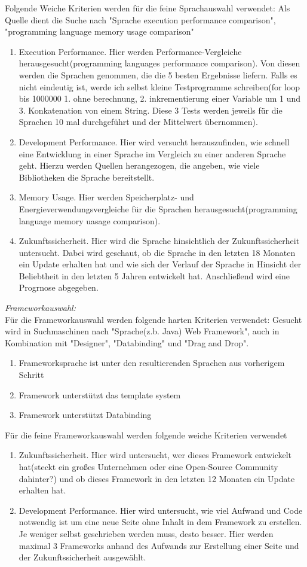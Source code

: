\documentclass{article}
\begin{document}
    Folgende Weiche Kriterien werden für die feine Sprachauswahl verwendet:
    Als Quelle dient die Suche nach "{}Sprache execution performance comparison"{}, "{}programming language memory usage comparison"{}
    \begin{enumerate}
        \item Execution Performance. Hier werden Performance-Vergleiche herausgesucht(programming languages performance comparison). Von diesen werden die Sprachen genommen, die die 5 besten Ergebnisse liefern. Falls es nicht eindeutig ist, werde ich selbst kleine Testprogramme schreiben(for loop bis 1000000 1. ohne berechnung, 2. inkrementierung einer Variable um 1 und 3. Konkatenation von einem String. Diese 3 Tests werden jeweils für die Sprachen 10 mal durchgeführt und der Mittelwert übernommen).
        \item Development Performance. Hier wird versucht herauszufinden, wie schnell eine Entwicklung in einer Sprache im Vergleich zu einer anderen Sprache geht. Hierzu werden Quellen herangezogen, die angeben, wie viele Bibliotheken die Sprache bereitstellt.
        \item Memory Usage. Hier werden Speicherplatz- und Energieverwendungsvergleiche für die Sprachen herausgesucht(programming language memory uasage comparison).
        \item Zukunftssicherheit. Hier wird die Sprache hinsichtlich der Zukunftssicherheit untersucht. Dabei wird geschaut, ob die Sprache in den letzten 18 Monaten ein Update erhalten hat und wie sich der Verlauf der Sprache in Hinsicht der Beliebtheit in den letzten 5 Jahren entwickelt hat. Anschließend wird eine Progrnose abgegeben.
    \end{enumerate}
    \textit{Frameworkauswahl:}\\
    Für die Frameworkauswahl werden folgende harten Kriterien verwendet:
    Gesucht wird in Suchmaschinen nach "{}Sprache(z.b. Java) Web Framework"{}, auch in Kombination mit "{}Designer"{}, "{}Databinding"{} und "{}Drag and Drop"{}.
    \begin{enumerate}
        \item Frameworksprache ist unter den resultierenden Sprachen aus vorherigem Schritt
        \item Framework unterstützt das template system
        \item Framework unterstützt Databinding
    \end{enumerate}
    Für die feine Frameworkauswahl werden folgende weiche Kriterien verwendet
    \begin{enumerate}
        \item Zukunftssicherheit. Hier wird untersucht, wer dieses Framework entwickelt hat(steckt ein großes Unternehmen oder eine Open-Source Community dahinter?) und ob dieses Framework in den letzten 12 Monaten ein Update erhalten hat.
        \item Development Performance. Hier wird untersucht, wie viel Aufwand und Code notwendig ist um eine neue Seite ohne Inhalt in dem Framework zu erstellen. Je weniger selbst geschrieben werden muss, desto besser. Hier werden maximal 3 Frameworks anhand des Aufwands zur Erstellung einer Seite und der Zukunftssicherheit ausgewählt.
    \end{enumerate}
\end{document}
